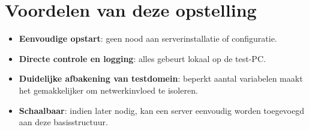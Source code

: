 \section*{Voordelen van deze opstelling}
\begin{itemize}
    \item \textbf{Eenvoudige opstart}: geen nood aan serverinstallatie of configuratie.
    \item \textbf{Directe controle en logging}: alles gebeurt lokaal op de test-PC.
    \item \textbf{Duidelijke afbakening van testdomein}: beperkt aantal variabelen maakt het gemakkelijker om netwerkinvloed te isoleren.
    \item \textbf{Schaalbaar}: indien later nodig, kan een server eenvoudig worden toegevoegd aan deze basisstructuur.
\end{itemize}